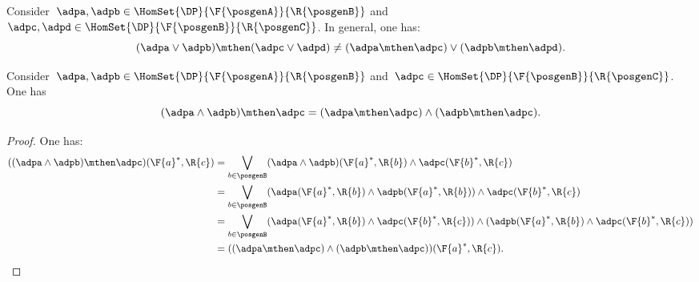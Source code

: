 {\begin{remark}
    Consider~$\adpa,\adpb\in \HomSet{\DP}{\F{\posgenA}}{\R{\posgenB}}$ and~$\adpc,\adpd\in \HomSet{\DP}{\F{\posgenB}}{\R{\posgenC}}$.
    In general, one has:
    \begin{equation*}
        (\adpa\vee \adpb)\mthen (\adpc\vee \adpd) \neq (\adpa \mthen \adpc)\vee (\adpb \mthen \adpd).
    \end{equation*}
\end{remark}

\begin{lemma}
    \label{lem:series_wedge}
    Consider~$\adpa,\adpb\in \HomSet{\DP}{\F{\posgenA}}{\R{\posgenB}}$ and~$\adpc\in \HomSet{\DP}{\F{\posgenB}}{\R{\posgenC}}$. One has
    \begin{equation*}
        (\adpa \wedge \adpb)\mthen \adpc=(\adpa \mthen \adpc) \wedge (\adpb\mthen \adpc).
    \end{equation*}
\end{lemma}
\begin{proof}
    One has:
    \begin{equation*}
        \begin{aligned}
            ((\adpa \wedge \adpb)\mthen \adpc)(\F{a}^*,\R{c})&=\bigvee_{b\in \posgenB} (\adpa \wedge \adpb)(\F{a}^*,\R{b})\wedge \adpc(\F{b}^*,\R{c})\\
            &=\bigvee_{b\in \posgenB} (\adpa(\F{a}^*,\R{b}) \wedge \adpb(\F{a}^*,\R{b}))\wedge \adpc(\F{b}^*,\R{c})\\
            &=\bigvee_{b\in \posgenB} (\adpa(\F{a}^*,\R{b}) \wedge  \adpc(\F{b}^*,\R{c})) \wedge (\adpb(\F{a}^*,\R{b})\wedge \adpc(\F{b}^*,\R{c}))\\
            &=((\adpa \mthen \adpc) \wedge (\adpb\mthen \adpc))(\F{a}^*,\R{c}).
        \end{aligned}
    \end{equation*}
\end{proof}

}
